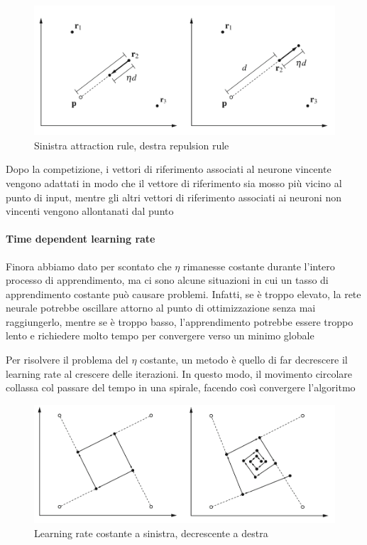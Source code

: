 \begin{figure}[h]
    \centering
    \includegraphics[scale=0.35]{images/attraction-repulsion.png}
    \caption{Sinistra attraction rule, destra repulsion rule}
\end{figure}

Dopo la competizione, i vettori di riferimento associati al neurone vincente vengono adattati in modo che il vettore di riferimento sia mosso più vicino al punto di input, mentre gli altri vettori di riferimento associati ai neuroni non vincenti vengono allontanati dal punto

\paragraph{Time dependent learning rate}
Finora abbiamo dato per scontato che $\eta$ rimanesse costante durante l'intero processo di apprendimento, ma ci sono alcune situazioni in cui un tasso di apprendimento costante può causare problemi. Infatti, se è troppo elevato, la rete neurale potrebbe oscillare attorno al punto di ottimizzazione senza mai raggiungerlo, mentre se è troppo basso, l'apprendimento potrebbe essere troppo lento e richiedere molto tempo per convergere verso un minimo globale

Per risolvere il problema del $\eta$ costante, un metodo è quello di far decrescere il learning rate al crescere delle iterazioni. In questo modo, il movimento circolare collassa col passare del tempo in una spirale, facendo così convergere l’algoritmo

\begin{figure}[h]
    \centering
    \includegraphics[scale=0.35]{images/dependent-learning-rate.png}
    \caption{Learning rate costante a sinistra, decrescente a destra}
\end{figure}

